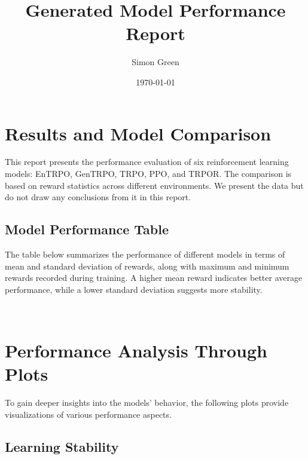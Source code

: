 \documentclass{article}
\begin{document}
\title{Generated Model Performance Report}
\author{Simon Green}
\date{\today}
\maketitle

\section*{Results and Model Comparison} 

This report presents the performance evaluation of six reinforcement learning models: EnTRPO, GenTRPO, TRPO, PPO, and TRPOR. The comparison is based on reward statistics across different environments. We present the data but do not draw any conclusions from it in this report.

\subsection*{Model Performance Table}

The table below summarizes the performance of different models in terms of mean and standard deviation of rewards, along with maximum and minimum rewards recorded during training. A higher mean reward indicates better average performance, while a lower standard deviation suggests more stability.

\bigskip

\begin{center}
  
\end{center}
\
\bigskip

\section*{Performance Analysis Through Plots}

To gain deeper insights into the models' behavior, the following plots provide visualizations of various performance aspects.

\subsection*{Learning Stability}
\end{document}
